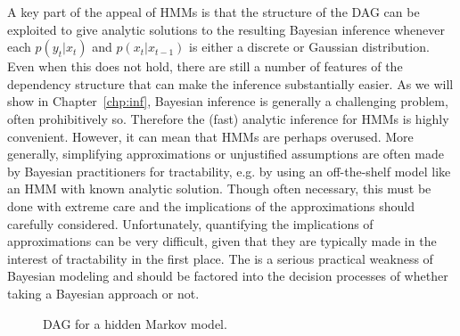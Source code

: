 A key part of the appeal of HMMs is that the structure of the
DAG can be exploited to give analytic solutions to the resulting Bayesian inference whenever each $p(y_t | x_t)$ 
and $p(x_t | x_{t-1})$ is either a discrete or Gaussian distribution. Even when this does not hold, there 
are still a number of features of the dependency structure that can make the inference substantially easier.
As we will show in Chapter~\ref{chp:inf}, Bayesian inference is generally a challenging problem, often prohibitively so.
Therefore the (fast) analytic inference for HMMs is highly convenient.  However, it can mean that HMMs are perhaps overused.
More generally, simplifying approximations or unjustified assumptions are often made by Bayesian practitioners 
for tractability, e.g. by using an off-the-shelf model like an HMM with known analytic solution. Though often necessary, 
this must be done with extreme care and the implications of the approximations should carefully considered.  Unfortunately, 
quantifying the implications of approximations can be very difficult, given that they are typically made in the interest
of tractability in the first place.  The is a serious practical weakness of Bayesian modeling and should be factored 
into the decision processes of whether taking a Bayesian approach or not.  

\begin{figure}[t]
	\centering 
	
	\caption{DAG for a hidden Markov model.
		\label{fig:bayes:hmm}}
\end{figure}